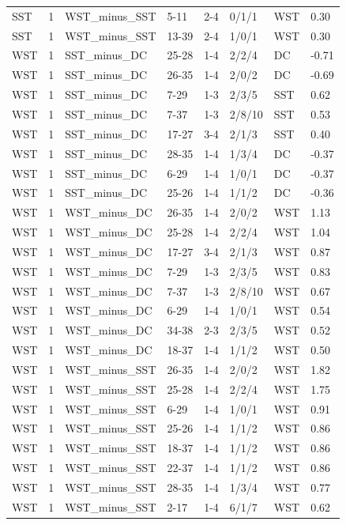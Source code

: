 \begin{table}[!h]
\begin{tabular}[t]{lrllllll}
SST & 1 & WST_minus_SST & 5-11 & 2-4 & 0/1/1 & WST & 0.30\\
SST & 1 & WST_minus_SST & 13-39 & 2-4 & 1/0/1 & WST & 0.30\\
WST & 1 & SST_minus_DC & 25-28 & 1-4 & 2/2/4 & DC & -0.71\\
\addlinespace
WST & 1 & SST_minus_DC & 26-35 & 1-4 & 2/0/2 & DC & -0.69\\
WST & 1 & SST_minus_DC & 7-29 & 1-3 & 2/3/5 & SST & 0.62\\
WST & 1 & SST_minus_DC & 7-37 & 1-3 & 2/8/10 & SST & 0.53\\
WST & 1 & SST_minus_DC & 17-27 & 3-4 & 2/1/3 & SST & 0.40\\
WST & 1 & SST_minus_DC & 28-35 & 1-4 & 1/3/4 & DC & -0.37\\
\addlinespace
WST & 1 & SST_minus_DC & 6-29 & 1-4 & 1/0/1 & DC & -0.37\\
WST & 1 & SST_minus_DC & 25-26 & 1-4 & 1/1/2 & DC & -0.36\\
WST & 1 & WST_minus_DC & 26-35 & 1-4 & 2/0/2 & WST & 1.13\\
WST & 1 & WST_minus_DC & 25-28 & 1-4 & 2/2/4 & WST & 1.04\\
WST & 1 & WST_minus_DC & 17-27 & 3-4 & 2/1/3 & WST & 0.87\\
\addlinespace
WST & 1 & WST_minus_DC & 7-29 & 1-3 & 2/3/5 & WST & 0.83\\
WST & 1 & WST_minus_DC & 7-37 & 1-3 & 2/8/10 & WST & 0.67\\
WST & 1 & WST_minus_DC & 6-29 & 1-4 & 1/0/1 & WST & 0.54\\
WST & 1 & WST_minus_DC & 34-38 & 2-3 & 2/3/5 & WST & 0.52\\
WST & 1 & WST_minus_DC & 18-37 & 1-4 & 1/1/2 & WST & 0.50\\
\addlinespace
WST & 1 & WST_minus_SST & 26-35 & 1-4 & 2/0/2 & WST & 1.82\\
WST & 1 & WST_minus_SST & 25-28 & 1-4 & 2/2/4 & WST & 1.75\\
WST & 1 & WST_minus_SST & 6-29 & 1-4 & 1/0/1 & WST & 0.91\\
WST & 1 & WST_minus_SST & 25-26 & 1-4 & 1/1/2 & WST & 0.86\\
WST & 1 & WST_minus_SST & 18-37 & 1-4 & 1/1/2 & WST & 0.86\\
\addlinespace
WST & 1 & WST_minus_SST & 22-37 & 1-4 & 1/1/2 & WST & 0.86\\
WST & 1 & WST_minus_SST & 28-35 & 1-4 & 1/3/4 & WST & 0.77\\
WST & 1 & WST_minus_SST & 2-17 & 1-4 & 6/1/7 & WST & 0.62\\

\end{tabular}
\end{table}
